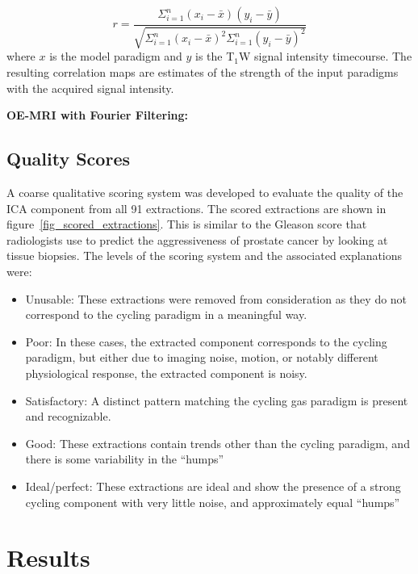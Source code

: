 \begin{equation}
r = \frac{\Sigma^n_{i=1} (x_i - \bar{x}) (y_i - \bar{y})}{\sqrt{\Sigma^n_{i=1} (x_i - \bar{x})^2 \Sigma^n_{i=1} (y_i - \bar{y})^2}}
\end{equation}
where $x$ is the model paradigm and $y$ is the T$_1$W signal intensity timecourse.
The resulting correlation maps are estimates of the strength of the input paradigms with the acquired signal intensity.

\noindent\textbf{OE-MRI with Fourier Filtering:} 

\subsection{Quality Scores}

A coarse qualitative scoring system was developed to evaluate the quality of the ICA component from all 91 extractions.
The scored extractions are shown in figure~\ref{fig_scored_extractions}.
This is similar to the Gleason score that radiologists use to predict the aggressiveness of prostate cancer by looking at tissue biopsies.
The levels of the scoring system and the associated explanations were:

\begin{itemize}
\item Unusable: These extractions were removed from consideration as they do not correspond to the cycling paradigm in a meaningful way.
\item Poor: In these cases, the extracted component corresponds to the cycling paradigm, but either due to imaging noise, motion, or notably different physiological response, the extracted component is noisy.
\item Satisfactory: A distinct pattern matching the cycling gas paradigm is present and recognizable.
\item Good: These extractions contain trends other than the cycling paradigm, and there is some variability in the ``humps'' 
\item Ideal/perfect: These extractions are ideal and show the presence of a strong cycling component with very little noise, and approximately equal ``humps''
\end{itemize}

\section{Results}

